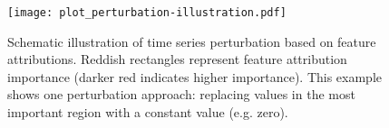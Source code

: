 \begin{figure}[!htbp]
\texttt{[image: plot\_perturbation-illustration.pdf]}
\caption{Schematic illustration of time series perturbation based on feature attributions. Reddish rectangles represent feature attribution importance (darker red indicates higher importance). This example shows one perturbation approach: replacing values in the most important region with a constant value (e.g. zero).}\label{fig:perturbation-illustration}
\end{figure}